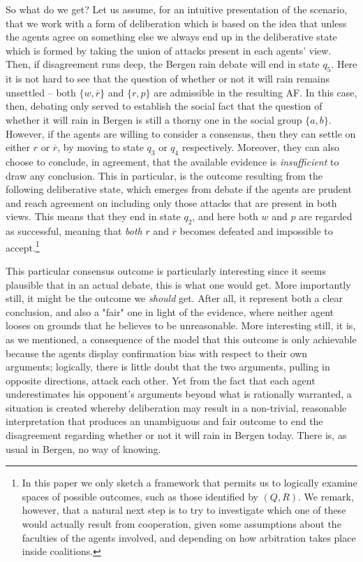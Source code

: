 \documentclass[greybox]{svmult}
\renewcommand{\bar}[1]{\overline{#1}}
\begin{document}
\begin{example}
So what do we get? Let us assume, for an intuitive presentation of the scenario, that we work with a form of deliberation which is based on the idea that unless the agents agree on something else we always end up in the deliberative state which is formed by taking the union of attacks present in each agents' view. Then, if disagreement runs deep, the Bergen rain debate will end in state $q_5$. Here it is not hard to see that the question of whether or not it will rain remains unsettled -- both $\{w,\bar r\}$ and $\{r,p\}$ are admissible in the resulting AF. In this case, then, debating only served to establish the social fact that the question of whether it will rain in Bergen is still a thorny one in the social group $\{a, b\}$. However, if the agents are willing to consider a consensus, then they can settle on either $r$ or $\bar r$, by moving to state $q_3$ or $q_4$ respectively. Moreover, they can also choose to conclude, in agreement, that the available evidence is \emph{insufficient} to draw any conclusion. This in particular, is the outcome resulting from the following deliberative state, which emerges from debate if the agents are prudent and reach agreement on including only those attacks that are present in both views. This means that they end in state $q_2$, and here both $w$ and $p$ are regarded as successful, meaning that \emph{both} $r$ and $\bar r$ becomes defeated and impossible to accept.\footnote{In this paper we only sketch a framework that permits us to logically examine spaces of possible outcomes, such as those identified by $(Q,R)$. We remark, however, that a natural next step is to try to investigate which one of these would actually result from cooperation, given some assumptions about the faculties of the agents involved, and depending on how arbitration takes place inside coalitions.} 

This particular consensus outcome is particularly interesting since it seems plausible that in an actual debate, this is what one would get. More importantly still, it might be the outcome we \emph{should} get. After all, it represent both a clear conclusion, and also a "fair" one in light of the evidence, where neither agent looses on grounds that he believes to be unreasonable. More interesting still, it is, as we mentioned, a consequence of the model that this outcome is only achievable because the agents display confirmation bias with respect to their own arguments; logically, there is little doubt that the two arguments, pulling in opposite directions, attack each other. Yet from the fact that each agent underestimates his opponent's arguments beyond what is rationally warranted, a situation is created whereby deliberation may result in a non-trivial, reasonable interpretation that produces an unambiguous and fair outcome to end the disagreement regarding whether or not it will rain in Bergen today. There is, as usual in Bergen, no way of knowing.

\end{example}
\end{document}
